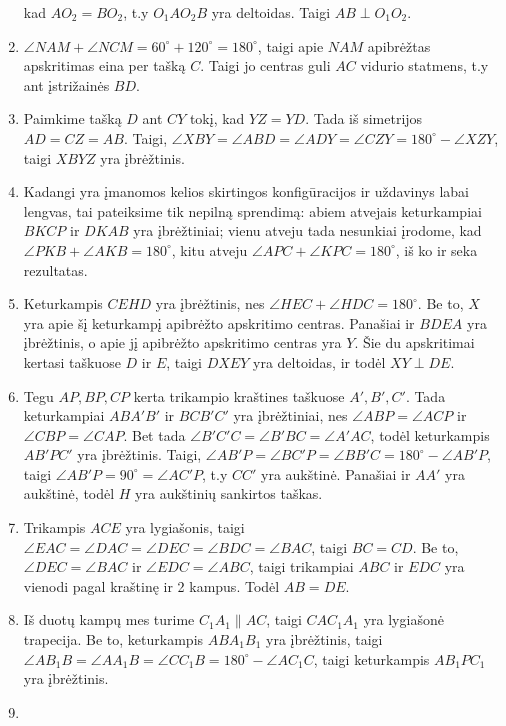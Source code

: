 \begin{enumerate}
  kad $AO_2 = BO_2$, t.y $O_1AO_2B$ yra deltoidas. Taigi
  $AB\perp{O_1 O_2}$.
\item
  $\angle NAM + \angle NCM = 60^\circ + 120^\circ =
  180^\circ$, taigi apie $NAM$ apibrėžtas apskritimas eina
  per tašką $C$. Taigi jo centras guli $AC$ vidurio
  statmens, t.y ant įstrižainės $BD$.
\item
  Paimkime tašką $D$ ant $CY$ tokį, kad $YZ = YD$. Tada iš
  simetrijos $AD = CZ = AB$. Taigi, $\angle XBY = \angle
  ABD = \angle ADY = \angle CZY = 180^\circ - \angle XZY$,
  taigi $XBYZ$ yra įbrėžtinis.
\item
  Kadangi yra įmanomos kelios skirtingos konfigūracijos ir
  uždavinys labai lengvas, tai pateiksime tik nepilną
  sprendimą: abiem atvejais keturkampiai $BKCP$ ir $DKAB$
  yra įbrėžtiniai; vienu atveju tada nesunkiai įrodome, kad
  $\angle PKB + \angle AKB = 180^\circ$, kitu atveju
  $\angle APC + \angle KPC = 180^\circ$, iš ko ir seka
  rezultatas.
\item
  Keturkampis $CEHD$ yra įbrėžtinis, nes $\angle HEC +
  \angle HDC = 180^\circ$. Be to, $X$ yra apie šį
  keturkampį apibrėžto apskritimo centras. Panašiai ir
  $BDEA$ yra įbrėžtinis, o apie jį apibrėžto apskritimo
  centras yra $Y$. Šie du apskritimai kertasi taškuose $D$
  ir $E$, taigi $DXEY$ yra deltoidas, ir todėl
  $XY\perp{DE}$.
\item
  Tegu $AP, BP, CP$ kerta trikampio kraštines taškuose $A',
  B', C'$. Tada keturkampiai $ABA'B'$ ir $BCB'C'$ yra
  įbrėžtiniai, nes $\angle ABP = \angle ACP$ ir $\angle CBP
  = \angle CAP$. Bet tada $\angle B'C'C = \angle B'BC =
  \angle A'AC$, todėl keturkampis $AB'PC'$ yra įbrėžtinis.
  Taigi, $\angle AB'P = \angle BC'P = \angle BB'C =
  180^\circ - \angle AB'P$, taigi $\angle AB'P = 90^\circ =
  \angle AC'P$, t.y $CC'$ yra aukštinė. Panašiai ir $AA'$
  yra aukštinė, todėl $H$ yra aukštinių sankirtos taškas.
\item
  Trikampis $ACE$ yra lygiašonis, taigi $\angle EAC =
  \angle DAC = \angle DEC = \angle BDC = \angle BAC$, taigi
  $BC = CD$. Be to, $\angle DEC = \angle BAC$ ir $\angle
  EDC = \angle ABC$, taigi trikampiai $ABC$ ir $EDC$ yra
  vienodi pagal kraštinę ir 2 kampus. Todėl $AB = DE$.
\item
  Iš duotų kampų mes turime $C_1A_1\parallel{AC}$, taigi
  $CAC_1A_1$ yra lygiašonė trapecija. Be to, keturkampis
  $ABA_1B_1$ yra įbrėžtinis, taigi $\angle AB_1B = \angle
  AA_1B = \angle CC_1B = 180^\circ - \angle AC_1C$, taigi
  keturkampis $AB_1PC_1$ yra įbrėžtinis.
\item

\end{enumerate}
